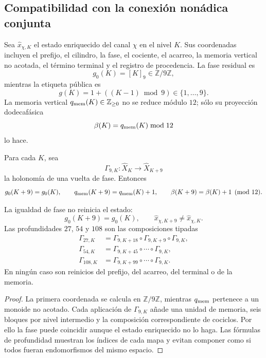 \subsection{Compatibilidad con la conexión nonádica conjunta}

Sea \(\widehat x_{\chi,K}\) el estado enriquecido del canal \(\chi\) en
el nivel \(K\). Sus coordenadas incluyen el prefijo, el cilindro, la fase,
el cociente, el acarreo, la memoria vertical no acotada, el término terminal
y el registro de procedencia. La fase residual es
\[
 g_0(K)=[K]_9\in\mathbb Z/9\mathbb Z,
\]
mientras la etiqueta pública es
\[
 g(K)=1+((K-1)\bmod9)\in\{1,\ldots,9\}.
\]
La memoria vertical \(q_{\rm mem}(K)\in\mathbb Z_{\geq0}\) no se reduce
módulo \(12\); sólo su proyección dodecafásica
\[
 \beta(K)=q_{\rm mem}(K)\bmod12
\]
lo hace.

Para cada \(K\), sea
\[
 \Gamma_{9,K}:\widehat X_K\longrightarrow\widehat X_{K+9}
\]
la holonomía de una vuelta de fase. Entonces
\[
 g_0(K+9)=g_0(K),
 \qquad
 q_{\rm mem}(K+9)=q_{\rm mem}(K)+1,
 \qquad
 \beta(K+9)=\beta(K)+1\pmod{12}.
\]

\begin{theorem}
\label{p12-83-c9-s4:thm:retorno-fase-conservacion-genealogica}
La igualdad de fase no reinicia el estado:
\[
 g_0(K+9)=g_0(K),
 \qquad
 \widehat x_{\chi,K+9}\ne\widehat x_{\chi,K}.
\]
Las profundidades \(27\), \(54\) y \(108\) son las composiciones tipadas
\begin{align*}
 \Gamma_{27,K}
 &=\Gamma_{9,K+18}\circ\Gamma_{9,K+9}\circ\Gamma_{9,K},\\
 \Gamma_{54,K}
 &=\Gamma_{9,K+45}\circ\cdots\circ\Gamma_{9,K},\\
 \Gamma_{108,K}
 &=\Gamma_{9,K+99}\circ\cdots\circ\Gamma_{9,K}.
\end{align*}
En ningún caso son reinicios del prefijo, del acarreo, del terminal o de la
memoria.
\end{theorem}

\begin{proof}
La primera coordenada se calcula en \(\mathbb Z/9\mathbb Z\), mientras
\(q_{\rm mem}\) pertenece a un monoide no acotado. Cada aplicación de
\(\Gamma_{9,K}\) añade una unidad de memoria, seis bloques por nivel
intermedio y la composición correspondiente de cociclos. Por ello la fase
puede coincidir aunque el estado enriquecido no lo haga. Las fórmulas de
profundidad muestran los índices de cada mapa y evitan componer como si todos
fueran endomorfismos del mismo espacio.
\end{proof}

